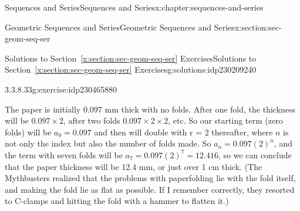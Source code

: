 \documentclass[twoside,10pt,]{book}
\newcommand{\xreffont}{\relax}
\numberwithin{equation}{section}
\providecommand\phantomsection{}
\begin{document}
\begin{chapterptx}{Sequences and Series}{}{Sequences and Series}{}{}{x:chapter:sequences-and-series}
\begin{sectionptx}{Geometric Sequences and Series}{}{Geometric Sequences and Series}{}{}{x:section:sec-geom-seq-ser}
\begin{solutions-subsection}{Solutions to Section~{\xreffont\ref*{x:section:sec-geom-seq-ser}} Exercises}{}{Solutions to Section~{\xreffont\ref*{x:section:sec-geom-seq-ser}} Exercises}{}{}{g:solutions:idp230209240}
\begin{divisionsolution}{3.3.8.33}{}{g:exercise:idp230465880}
\par\smallskip%
\noindent\hypertarget{g:solution:idp230464856-main}{}The paper is initially 0.097 mm thick with no folds.  After one fold, the thickness will be \(0.097\times2\), after two folds \(0.097\times2\times2\), etc.  So our starting term (zero folds) will be \(a_0=0.097\) and then will double with r = 2 thereafter, where \(n\) is not only the index but also the number of folds made. So \({a_n} = 0.097{\left( 2 \right)^n}\), and the term with seven folds will be \({a_7} = 0.097{\left( 2 \right)^7} = 12.416\), so we can conclude that the paper thickness will be 12.4 mm, or just over 1 cm thick. (The Mythbusters realized that the problems with paperfolding lie with the fold itself, and making the fold lie as flat as possible.  If I remember correctly, they resorted to C-clamps and hitting the fold with a hammer to flatten it.)\end{divisionsolution}%
\end{solutions-subsection}
\end{sectionptx}
\end{chapterptx}
%
\backmatter%
%
\clearpage\phantomsection%
%
%
{\xreffont\printindex}
%
\end{document}
